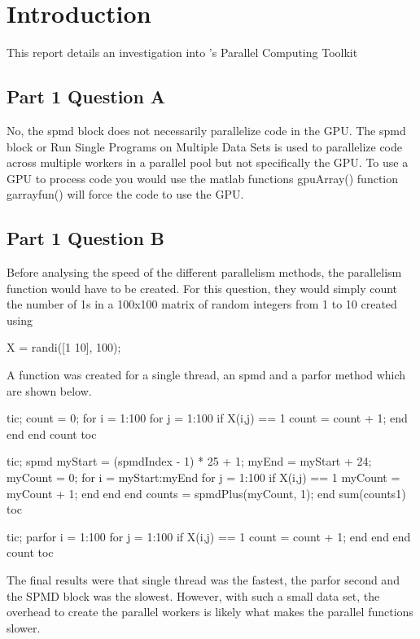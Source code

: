 \section{Introduction}
\usepackage{xspace}

This report details an investigation into \MATLAB's Parallel Computing Toolkit 

\subsection{Part 1 Question A}
No, the spmd block does not necessarily parallelize code in the GPU.
The spmd block or Run Single Programs on Multiple Data Sets is used to parallelize code across multiple workers in a parallel pool but not specifically the GPU. To use a GPU to process code you would use the matlab functions gpuArray() function garrayfun() will force the code to use the GPU.

\subsection{Part 1 Question B}
Before analysing the speed of the different parallelism methods, the parallelism function would have to be created.
For this question, they would simply count the number of 1s in a 100x100 matrix of random integers from 1 to 10 created using

\begin{Matlab}
    X = randi([1 10], 100);
\end{Matlab}

A function was created for a single thread, an spmd and a parfor method which are shown below.

\begin{Matlab}
    tic;
    count = 0;
    for i = 1:100
        for j = 1:100
            if X(i,j) == 1
                count = count + 1;
            end
        end
    end
    count
    toc
\end{Matlab}

\begin{Matlab}
    tic;
    spmd
        myStart = (spmdIndex - 1) * 25 + 1;
        myEnd = myStart + 24;
        myCount = 0;
        for i = myStart:myEnd
            for j = 1:100
                if X(i,j) == 1
                    myCount = myCount + 1;
                end
            end
        end
        counts = spmdPlus(myCount, 1);
    end
    sum(counts{1})
    toc
\end{Matlab}

\begin{Matlab}
    tic;
    parfor i = 1:100
        for j = 1:100
            if X(i,j) == 1
                count = count + 1;
            end
        end
    end
    count
    toc
\end{Matlab}

The final results were that single thread was the fastest, the parfor second and the SPMD block was the slowest.
However, with such a small data set, the overhead to create the parallel workers is likely what makes the parallel functions slower.